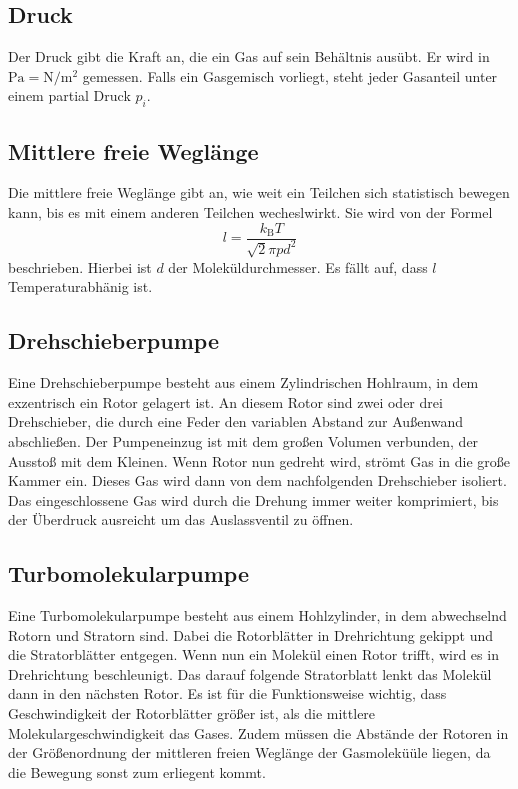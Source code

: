 \subsection{Druck}
Der Druck gibt die Kraft an, die ein Gas auf sein Behältnis ausübt. Er wird in $\si{\pascal}=\si{\newton \per \meter \squared}$ gemessen. Falls ein Gasgemisch
vorliegt, steht jeder Gasanteil unter einem partial Druck $p_i$.
\subsection{Mittlere freie Weglänge}
Die mittlere freie Weglänge gibt an, wie weit ein Teilchen sich statistisch bewegen kann, bis es mit einem anderen Teilchen wecheslwirkt.
Sie wird von der Formel
\begin{equation}
	l=\frac{k_\text{B}T}{\sqrt{2}\pi p d^2}
\end{equation}
beschrieben. Hierbei ist $d$ der Moleküldurchmesser. Es fällt auf, dass $l$ Temperaturabhänig ist.

\subsection{Drehschieberpumpe}
Eine Drehschieberpumpe besteht aus einem Zylindrischen Hohlraum, in dem exzentrisch ein Rotor gelagert ist. An diesem Rotor sind zwei oder drei Drehschieber,
die durch eine Feder den variablen Abstand zur Außenwand abschließen. Der Pumpeneinzug ist mit dem großen Volumen verbunden, der Ausstoß mit dem Kleinen.
Wenn Rotor nun gedreht wird, strömt Gas in die große Kammer ein. Dieses Gas wird dann von dem nachfolgenden Drehschieber isoliert. Das eingeschlossene Gas wird
durch die Drehung immer weiter komprimiert, bis der Überdruck ausreicht um das Auslassventil zu öffnen.
\subsection{Turbomolekularpumpe}
Eine Turbomolekularpumpe besteht aus einem Hohlzylinder, in dem abwechselnd Rotorn und Stratorn sind. Dabei die Rotorblätter in Drehrichtung gekippt und die
Stratorblätter entgegen. Wenn nun ein Molekül einen Rotor trifft, wird es in Drehrichtung beschleunigt. Das darauf folgende Stratorblatt lenkt das Molekül dann
in den nächsten Rotor. Es ist für die Funktionsweise wichtig, dass Geschwindigkeit der Rotorblätter größer ist, als die mittlere Molekulargeschwindigkeit das
Gases. Zudem müssen die Abstände der Rotoren in der Größenordnung der mittleren freien Weglänge der Gasmoleküüle liegen, da die Bewegung sonst zum erliegent
kommt.
